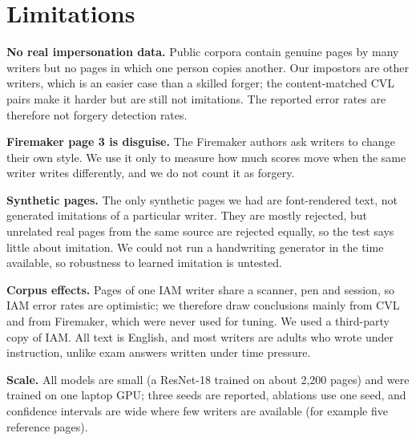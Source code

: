 \section{Limitations}
\label{sec:limits}
\textbf{No real impersonation data.}
Public corpora contain genuine pages by many writers but no pages in which one person copies another.
Our impostors are other writers, which is an easier case than a skilled forger; the content-matched CVL pairs make it harder but are still not imitations.
The reported error rates are therefore not forgery detection rates.

\textbf{Firemaker page 3 is disguise.}
The Firemaker authors ask writers to change their own style.
We use it only to measure how much scores move when the same writer writes differently, and we do not count it as forgery.

\textbf{Synthetic pages.}
The only synthetic pages we had are font-rendered text, not generated imitations of a particular writer.
They are mostly rejected, but unrelated real pages from the same source are rejected equally, so the test says little about imitation.
We could not run a handwriting generator in the time available, so robustness to learned imitation is untested.

\textbf{Corpus effects.}
Pages of one IAM writer share a scanner, pen and session, so IAM error rates are optimistic; we therefore draw conclusions mainly from CVL and from Firemaker, which were never used for tuning.
We used a third-party copy of IAM.
All text is English, and most writers are adults who wrote under instruction, unlike exam answers written under time pressure.

\textbf{Scale.}
All models are small (a ResNet-18 trained on about 2,200 pages) and were trained on one laptop GPU; three seeds are reported, ablations use one seed, and confidence intervals are wide where few writers are available (for example five reference pages).
